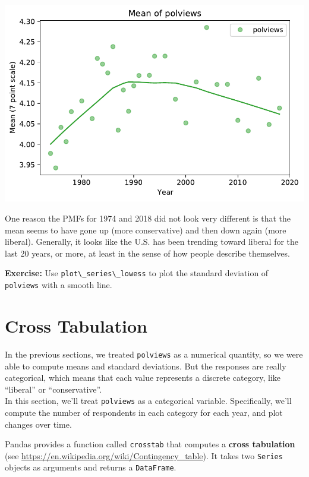 \begin{center}
\includegraphics[scale=0.75]{chapters/02_polviews_soln_files/02_polviews_soln_57_0.pdf}
\end{center}

One reason the PMFs for 1974 and 2018 did not look very different is
that the mean seems to have gone up (more conservative) and then down
again (more liberal). Generally, it looks like the U.S. has been
trending toward liberal for the last 20 years, or more, at least in the
sense of how people describe themselves.

\textbf{Exercise:} Use \passthrough{\lstinline!plot\_series\_lowess!} to
plot the standard deviation of \passthrough{\lstinline!polviews!} with a
smooth line.

\hypertarget{cross-tabulation}{%
\section{Cross Tabulation}\label{cross-tabulation}}

In the previous sections, we treated \passthrough{\lstinline!polviews!}
as a numerical quantity, so we were able to compute means and standard
deviations. But the responses are really categorical, which means that
each value represents a discrete category, like ``liberal'' or
``conservative''.\\
In this section, we'll treat \passthrough{\lstinline!polviews!} as a
categorical variable. Specifically, we'll compute the number of
respondents in each category for each year, and plot changes over time.

Pandas provides a function called \passthrough{\lstinline!crosstab!}
that computes a \textbf{cross tabulation} (see
\url{https://en.wikipedia.org/wiki/Contingency_table}). It takes two
\passthrough{\lstinline!Series!} objects as arguments and returns a
\passthrough{\lstinline!DataFrame!}.

